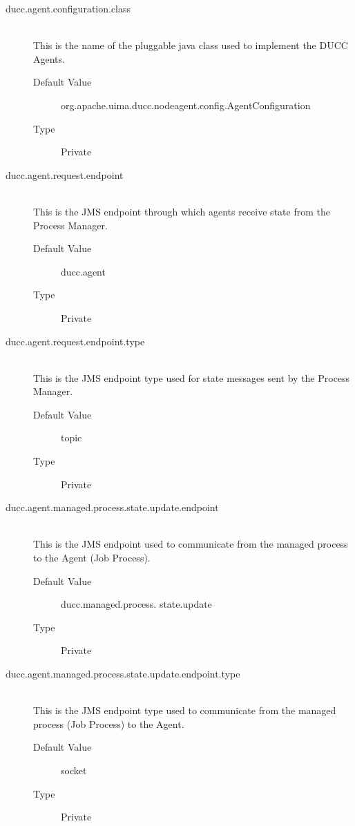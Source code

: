     \begin{description}

        \item[ducc.agent.configuration.class] \hfill \\
          This is the name of the pluggable java class used to implement the DUCC Agents. 
          \begin{description}
            \item[Default Value] org.apache.uima.ducc.nodeagent.config.AgentConfiguration 
            \item[Type] Private 
          \end{description}
          
        \item[ducc.agent.request.endpoint] \hfill \\
          This is the JMS endpoint through which agents receive state from the Process Manager. 
          \begin{description}
            \item[Default Value] ducc.agent 
            \item[Type] Private 
          \end{description}
          
        \item[ducc.agent.request.endpoint.type] \hfill \\
          This is the JMS endpoint type used for state messages sent by the Process Manager. 
          \begin{description}
            \item[Default Value] topic 
            \item[Type] Private 
          \end{description}
          
        \item[ducc.agent.managed.process.state.update.endpoint] \hfill \\
          This is the JMS endpoint used to communicate from the managed process to the Agent 
          (Job Process). 
          \begin{description}
            \item[Default Value] ducc.managed.process. state.update 
            \item[Type] Private
          \end{description} 
          
        \item[ducc.agent.managed.process.state.update.endpoint.type] \hfill \\
          This is the JMS endpoint type used to communicate from the managed process (Job 
          Process) to the Agent. 
          \begin{description}
            \item[Default Value] socket 
            \item[Type] Private 
          \end{description}
          

\end{description}
